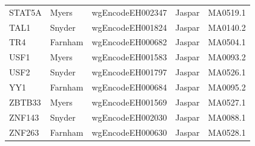 \documentclass{bioinfo}
\begin{document}
\begin{table}[t]
\begin{center}
\begin{tabular}{ l|ll|ll }
        STAT5A  & Myers   & wgEncodeEH002347 & Jaspar     & MA0519.1 \\
        TAL1    & Snyder  & wgEncodeEH001824 & Jaspar     & MA0140.2 \\
        TR4     & Farnham & wgEncodeEH000682 & Jaspar     & MA0504.1 \\
        USF1    & Myers   & wgEncodeEH001583 & Jaspar     & MA0093.2 \\
        USF2    & Snyder  & wgEncodeEH001797 & Jaspar     & MA0526.1 \\
        YY1     & Farnham & wgEncodeEH000684 & Jaspar     & MA0095.2 \\
        ZBTB33  & Myers   & wgEncodeEH001569 & Jaspar     & MA0527.1 \\
        ZNF143  & Snyder  & wgEncodeEH002030 & Jaspar     & MA0088.1 \\
        ZNF263  & Farnham & wgEncodeEH000630 & Jaspar     & MA0528.1 \\
        \hline
    \end{tabular}
\end{center}
\end{table}
\end{document}
